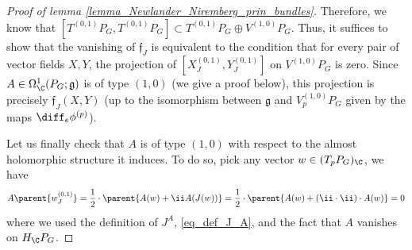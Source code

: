 \begin{proof}[\textit{Proof of lemma} \ref{lemma_Newlander_Niremberg_prin_bundles}]
    Therefore, we know that \([T^{(0,1)}P_G, T^{(0,1)}P_G]\subset T^{(0,1)}P_G \oplus V^{(1,0)}P_G\). Thus, it suffices to show that the vanishing of \(\mathfrak{f}_J\) is equivalent to the condition that for every pair of vector fields \(X,Y\), the projection of \([X^{(0,1)}_J, Y^{(0,1)}_J]\) on \(V^{(1,0)}P_G\) is zero. Since \(A\in \Omega_\C^1(P_G; \mathfrak{g})\) is of type \((1,0)\) (we give a proof below), this projection is precisely \(\mathfrak{f}_J(X,Y)\) (up to the isomorphism between \(\mathfrak{g}\) and \(V_p^{(1,0)}P_G\) given by the maps \(\diff_e\phi^{(p)}\)).   

    Let us finally check that \(A\) is of type \((1,0)\) with respect to the almost holomorphic structure it induces. To do so, pick any vector \(w \in (T_pP_G)_\C\), we have 
    \[
    A\parent{w_J^{(0,1)}}=\frac{1}{2}\cdot \parent{A(w)+\ii A(J(w))}=\frac{1}{2}\cdot \parent{A(w)+(\ii\cdot \ii)\cdot  A(w)}=0
    \]
    where we used the definition of \(J^A\), \eqref{eq_def_J_A}, and the fact that \(A\) vanishes on \(H_\C P_G\).
\end{proof}

